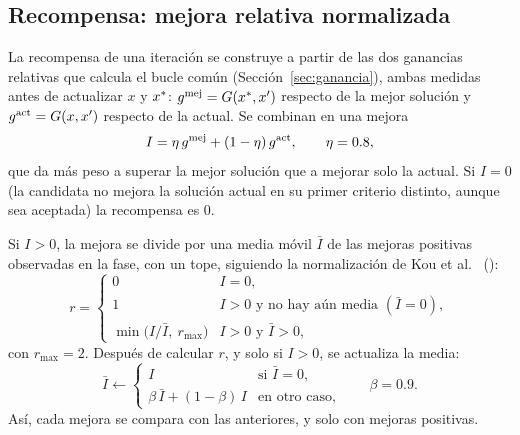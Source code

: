 \subsection{Recompensa: mejora relativa normalizada}
\label{sec:recompensa}

La recompensa de una iteración se construye a partir de las dos ganancias relativas que
calcula el bucle común (Sección~\ref{sec:ganancia}), ambas medidas antes de actualizar $x$ y
$x^{*}$: $g^{\mathrm{mej}}=G(x^{*},x')$ respecto de la mejor solución y $g^{\mathrm{act}}=G(x,x')$ respecto de la
actual. Se combinan en una mejora
\begin{equation}
I=\eta\,g^{\mathrm{mej}}+(1-\eta)\,g^{\mathrm{act}},\qquad \eta=0.8,
\label{eq:mejora}
\end{equation}
que da más peso a superar la mejor solución que a mejorar solo la actual. Si $I=0$ (la
candidata no mejora la solución actual en su primer criterio distinto, aunque sea aceptada) la
recompensa es $0$.

Si $I>0$, la mejora se divide por una media móvil $\bar{I}$ de las mejoras positivas
observadas en la fase, con un tope, siguiendo la normalización de Kou et al.~\cite{kou2026}
():
\begin{equation}
r=
\begin{cases}
0 & I=0,\\
1 & I>0 \text{ y no hay aún media } (\bar{I}=0),\\
\min\bigl(I/\bar{I},\ r_{\max}\bigr) & I>0 \text{ y } \bar{I}>0,
\end{cases}
\label{eq:recompensa}
\end{equation}
con $r_{\max}=2$. Después de calcular $r$, y solo si $I>0$, se actualiza la media:
\begin{equation}
\bar{I}\gets
\begin{cases}
I & \text{si } \bar{I}=0,\\
\beta\,\bar{I}+(1-\beta)\,I & \text{en otro caso,}
\end{cases}
\qquad \beta=0.9 .
\label{eq:media}
\end{equation}
Así, cada mejora se compara con las anteriores, y solo con mejoras positivas.

